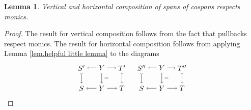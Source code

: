 \documentclass[11pt]{amsart}
\newtheorem{lem}[thm]{Lemma}
\theoremstyle{remark}
\theoremstyle{definition}
\begin{document}
%
%
%
%
%
%

\begin{lem}
	Vertical and horizontal composition of 
	spans of cospans respects monics.
\end{lem}
\begin{proof}
	The result for vertical composition 
	follows from the fact that pullbacks 
	respect monics. The result for horizontal 
	composition follows from applying Lemma 
	\ref{lem.helpful little lemma} to the 
	diagrams
	\[
	\begin{tikzpicture}[baseline=(current  bounding  box.center)]
	\node (B) at (-1,1) {$S'$};
	\node (A) at (0,1) {$Y$};
	\node (C) at (1,1) {$T'$};
	\node (B') at (-1,0) {$S$};
	\node (A') at (0,0) {$Y$};
	\node (C') at (1,0) {$T$};
	\draw [->] (A) edge (B);
	\draw [font=\scriptsize,->] (A) edge node[right] {$=$} (A');
	\draw [->] (A) edge (C);
	\draw [->] (A') edge (B');
	\draw [->] (A') edge (C');
	\draw [>->] (B) edge (B');
	\draw [>->] (C) edge (C');
	\end{tikzpicture}
	\quad
	\begin{tikzpicture}[baseline=(current  bounding  box.center)]
	\node (B) at (-1,1) {$S''$};
	\node (A) at (0,1) {$Y$};
	\node (C) at (1,1) {$T''$};
	\node (B') at (-1,0) {$S$};
	\node (A') at (0,0) {$Y$};
	\node (C') at (1,0) {$T$};
	\draw [->] (A) edge (B);
	\draw [font=\scriptsize,->] (A) edge node[right] {$=$} (A');
	\draw [->] (A) edge (C);
	\draw [->] (A') edge (B');
	\draw [->] (A') edge (C');
	\draw [>->] (B) edge (B');
	\draw [>->] (C) edge (C');
	\end{tikzpicture}
	\qedhere
	\]
\end{proof}
\end{document}
